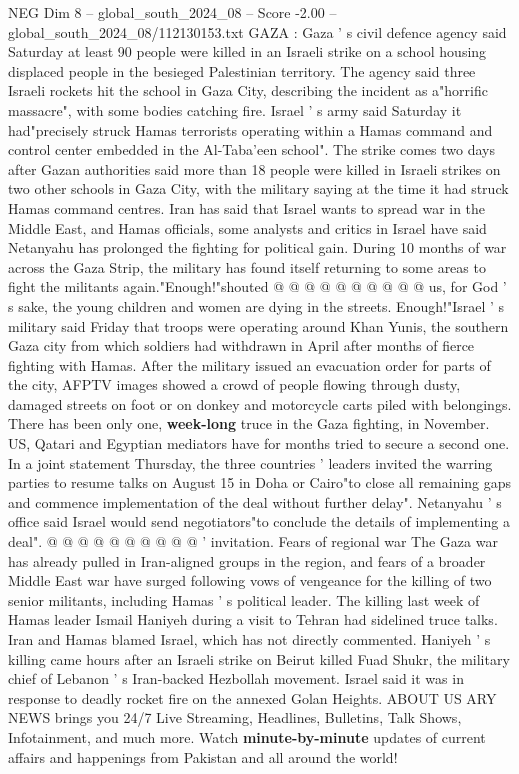 \begin{textsample}{NEG Dim 8 – global\_south\_2024\_08 – Score -2.00 – global\_south\_2024\_08/112130153.txt}  \label{ex:f8_neg_069}
GAZA : Gaza ' s civil defence agency said Saturday at least 90 people were killed in an Israeli strike on a school housing displaced people in the besieged Palestinian territory.
The agency said three Israeli rockets hit the school in Gaza City, describing the incident as a"horrific massacre", with some bodies catching fire.
Israel ' s army said Saturday it had"precisely struck Hamas terrorists operating within a Hamas command and control center embedded in the Al-Taba'een school".
The strike comes two days after Gazan authorities said more than 18 people were killed in Israeli strikes on two other schools in Gaza City, with the military saying at the time it had struck Hamas command centres.
Iran has said that Israel wants to spread war in the Middle East, and Hamas officials, some analysts and critics in Israel have said Netanyahu has prolonged the fighting for political gain.
During 10 months of war across the Gaza Strip, the military has found itself returning to some areas to fight the militants again."Enough!"shouted @ @ @ @ @ @ @ @ @ @ us, for God ' s sake, the young children and women are dying in the streets.
Enough!"Israel ' s military said Friday that troops were operating around Khan Yunis, the southern Gaza city from which soldiers had withdrawn in April after months of fierce fighting with Hamas.
After the military issued an evacuation order for parts of the city, AFPTV images showed a crowd of people flowing through dusty, damaged streets on foot or on donkey and motorcycle carts piled with belongings.
There has been only one, \textbf{week-long} truce in the Gaza fighting, in November.
US, Qatari and Egyptian mediators have for months tried to secure a second one.
In a joint statement Thursday, the three countries ' leaders invited the warring parties to resume talks on August 15 in Doha or Cairo"to close all remaining gaps and commence implementation of the deal without further delay".
Netanyahu ' s office said Israel would send negotiators"to conclude the details of implementing a deal". @ @ @ @ @ @ @ @ @ @ ' invitation.
Fears of regional war The Gaza war has already pulled in Iran-aligned groups in the region, and fears of a broader Middle East war have surged following vows of vengeance for the killing of two senior militants, including Hamas ' s political leader.
The killing last week of Hamas leader Ismail Haniyeh during a visit to Tehran had sidelined truce talks.
Iran and Hamas blamed Israel, which has not directly commented.
Haniyeh ' s killing came hours after an Israeli strike on Beirut killed Fuad Shukr, the military chief of Lebanon ' s Iran-backed Hezbollah movement.
Israel said it was in response to deadly rocket fire on the annexed Golan Heights.
ABOUT US ARY NEWS brings you 24/7 Live Streaming, Headlines, Bulletins, Talk Shows, Infotainment, and much more.
Watch \textbf{minute-by-minute} updates of current affairs and happenings from Pakistan and all around the world!

\end{textsample}
